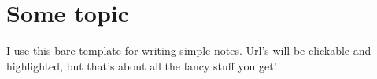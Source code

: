 \documentclass[a4paper,12pt,dvipsnames*]{article}
\begin{document}
\section*{Some topic}
  I use this bare template for writing simple notes. Url's will be clickable and highlighted, but that's about all the fancy stuff you get!
\end{document}

